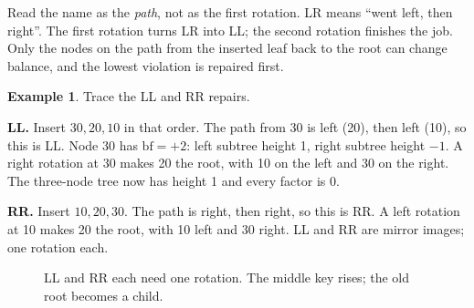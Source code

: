 \documentclass[11pt]{article}
\theoremstyle{definition}
\newtheorem{example}{Example}[section]
\begin{document}
Read the name as the \emph{path}, not as the first rotation. LR means ``went
left, then right''. The first rotation turns LR into LL; the second rotation
finishes the job. Only the nodes on the path from the inserted leaf back to
the root can change balance, and the lowest violation is repaired first.

\begin{example}
Trace the LL and RR repairs.

\textbf{LL.} Insert $30,20,10$ in that order. The path from 30 is left
(20), then left (10), so this is LL. Node 30 has
$\mathrm{bf}=+2$: left subtree height 1, right subtree height $-1$. A right
rotation at 30 makes 20 the root, with 10 on the left and 30 on the right.
The three-node tree now has height 1 and every factor is 0.

\textbf{RR.} Insert $10,20,30$. The path is right, then right, so this is
RR. A left rotation at 10 makes 20 the root, with 10 left and 30 right. LL
and RR are mirror images; one rotation each.
\end{example}

\begin{figure}[h]
  \centering
  \caption{LL and RR each need one rotation. The middle key rises; the old
    root becomes a child.}
  \label{fig:llrr}
\end{figure}
\end{document}
